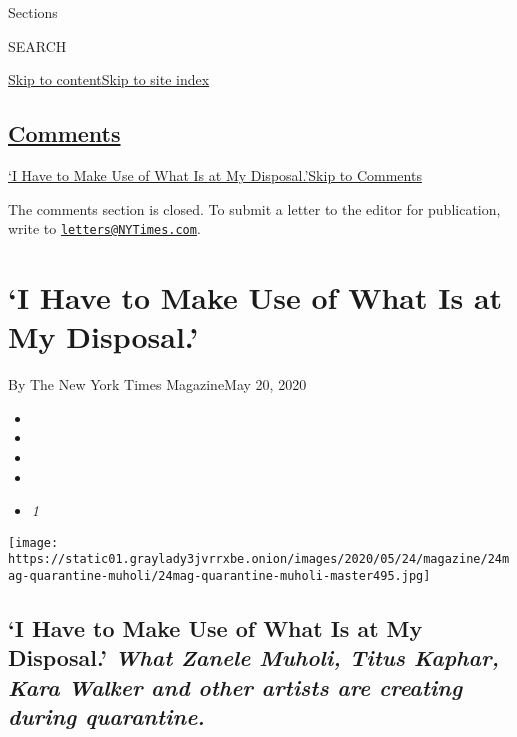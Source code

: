 Sections

SEARCH

\protect\hyperlink{site-content}{Skip to
content}\protect\hyperlink{site-index}{Skip to site index}

\hypertarget{comments}{%
\subsection{\texorpdfstring{\protect\hyperlink{commentsContainer}{Comments}}{Comments}}\label{comments}}

\href{}{`I Have to Make Use of What Is at My Disposal.'}\href{}{Skip to
Comments}

The comments section is closed. To submit a letter to the editor for
publication, write to
\href{mailto:letters@NYTimes.com}{\nolinkurl{letters@NYTimes.com}}.

\hypertarget{i-have-to-make-use-of-what-is-at-my-disposal}{%
\section{`I Have to Make Use of What Is at My
Disposal.'}\label{i-have-to-make-use-of-what-is-at-my-disposal}}

By The New York Times MagazineMay 20, 2020

\begin{itemize}
\item
\item
\item
\item
\item
  \emph{1}
\end{itemize}

\texttt{[image: https://static01.graylady3jvrrxbe.onion/images/2020/05/24/magazine/24mag-quarantine-muholi/24mag-quarantine-muholi-master495.jpg]}

\hypertarget{i-have-to-make-use-of-what-is-at-my-disposal-what-zanele-muholi-titus-kaphar-kara-walker-and-other-artists-are-creating-during-quarantine}{%
\subsection{\texorpdfstring{`I Have to Make Use of What Is at My
Disposal.' \emph{What Zanele Muholi, Titus Kaphar, Kara Walker and other
artists are creating during
quarantine.}}{`I Have to Make Use of What Is at My Disposal.' What Zanele Muholi, Titus Kaphar, Kara Walker and other artists are creating during quarantine.}}\label{i-have-to-make-use-of-what-is-at-my-disposal-what-zanele-muholi-titus-kaphar-kara-walker-and-other-artists-are-creating-during-quarantine}}

